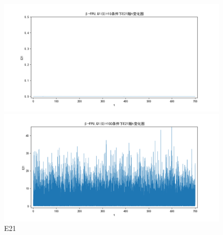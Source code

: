 \documentclass[10pt, a4paper]{article}
\begin{document}
    \begin{figure}[H]
        \begin{minipage}[t]{0.49\textwidth}
            \centering
            \includegraphics[width=\textwidth]{./q6_pics/cmp/E21.png}
        \end{minipage}
        \begin{minipage}[t]{0.49\textwidth}
            \centering
            \includegraphics[width=\textwidth]{./q6_pics/exp/E21.png}
        \end{minipage}
        \caption{E21}\label{fig:E21 in q6}
    \end{figure}
\end{document}
